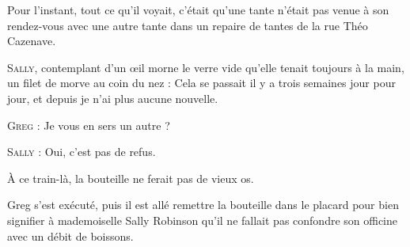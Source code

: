 Pour l’instant, tout ce qu’il voyait, c’était qu’une tante n’était pas venue à son rendez-vous avec une autre tante dans un repaire de tantes de la rue Théo Cazenave.

\begin{dialogue}

\textsc{Sally}, contemplant d’un œil morne le verre vide qu’elle tenait toujours à la main, un filet de morve au coin du nez : Cela se passait il y a trois semaines jour pour jour, et depuis je n’ai plus aucune nouvelle.

\textsc{Greg} : Je vous en sers un autre ?

\textsc{Sally} : Oui, c’est pas de refus.

\end{dialogue}

À ce train-là, la bouteille ne ferait pas de vieux os.

Greg s’est exécuté, puis il est allé remettre la bouteille dans le placard pour bien signifier à mademoiselle Sally Robinson qu’il ne fallait pas confondre son officine avec un débit de boissons.

